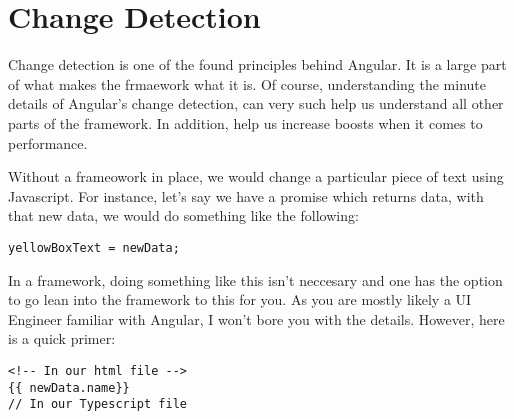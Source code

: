 \section{ Change Detection }
\maketitle{}

Change detection is one of the found principles behind Angular. It is a large
part of what makes the frmaework what it is. Of course, understanding the
minute details of Angular's change detection, can very such help us understand
all other parts of the framework. In addition, help us increase boosts when it
comes to performance.

Without a frameowork in place, we would change a particular piece of text
using Javascript. For instance, let's say we have a promise which returns data,
with that new data, we would do something like the following:

\begin{lstlisting}
yellowBoxText = newData;
\end{lstlisting}

In a framework, doing something like this isn't neccesary and one has the option
to go lean into the framework to this for you. As you are mostly likely a UI
Engineer familiar with Angular, I won't bore you with the details. However, here
is a quick primer:
\begin{lstlisting}
<!-- In our html file -->
{{ newData.name}}
// In our Typescript file 
\end{lstlisting}

